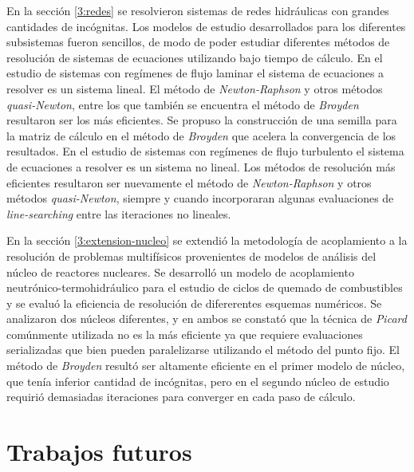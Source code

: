 En la sección \ref{3:redes} se resolvieron sistemas de redes hidráulicas con grandes cantidades de incógnitas.
Los modelos de estudio desarrollados para los diferentes subsistemas fueron sencillos,
de modo de poder estudiar diferentes métodos de resolución de sistemas de ecuaciones utilizando bajo tiempo de cálculo.
En el estudio de sistemas con regímenes de flujo laminar el sistema de ecuaciones a resolver es un sistema lineal.
El método de \textit{Newton-Raphson} y otros métodos \textit{quasi-Newton}, entre los que también se encuentra el método de \textit{Broyden} resultaron ser los más eficientes.
Se propuso la construcción de una semilla para la matriz de cálculo en el método de \textit{Broyden} que acelera la convergencia de los resultados.
En el estudio de sistemas con regímenes de flujo turbulento el sistema de ecuaciones a resolver es un sistema no lineal.
Los métodos de resolución más eficientes resultaron ser nuevamente el método de \textit{Newton-Raphson} y otros métodos \textit{quasi-Newton},
siempre y cuando incorporaran algunas evaluaciones de \textit{line-searching} entre las iteraciones no lineales.

En la sección \ref{3:extension-nucleo} se extendió la metodología de acoplamiento a la resolución de problemas multifísicos provenientes de modelos de análisis del núcleo de reactores nucleares.
Se desarrolló un modelo de acoplamiento neutrónico-termohidráulico para el estudio de ciclos de quemado de combustibles y se evaluó la eficiencia de resolución de difererentes esquemas numéricos.
Se analizaron dos núcleos diferentes, y en ambos se constató que la técnica de \textit{Picard} comúnmente utilizada no es la más eficiente ya que requiere evaluaciones serializadas
que bien pueden paralelizarse utilizando el método del punto fijo.
El método de \textit{Broyden} resultó ser altamente eficiente en el primer modelo de núcleo, que tenía inferior cantidad de incógnitas,
pero en el segundo núcleo de estudio requirió demasiadas iteraciones para converger en cada paso de cálculo.


\section{Trabajos futuros}
\label{trabajos-futuros}


